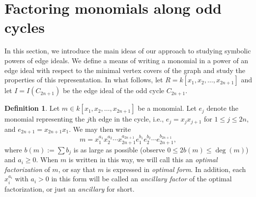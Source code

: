 \documentclass[12pt]{amsart}
\renewcommand{\ge}{\geqslant}
\renewcommand{\le}{\leqslant}
\theoremstyle{plain}
\newtheorem{theorem}{Theorem}[section]
\theoremstyle{definition}
\newtheorem{definition}[theorem]{Definition}
\begin{document}




\section{Factoring monomials along odd cycles}

In this section, we introduce the main ideas of our approach to studying symbolic powers of edge ideals.
We define a means of writing a monomial in a power of an edge ideal with respect to the minimal vertex covers of the graph and study the properties of this representation.
In what follows, let $R = k[x_1,x_2,\ldots,x_{2n+1}]$ and let $I = I(C_{2n+1})$ be the edge ideal of the odd cycle $C_{2n+1}$. %




\begin{definition}\label{defn:optimal}
Let $m\in k[x_1,x_2,\ldots,x_{2n+1}]$ be a monomial.
	Let $e_j$ denote the monomial representing the $j$th edge in the cycle, i.e., $e_j = x_j x_{j+1}$ for $1\le j \le 2n$, and $e_{2n+1} = x_{2n+1} x_1$.
	We may then write 
	$$
		m = x_1^{a_1} x_2^{a_2} \cdots x_{2n+1}^{a_{2n+1}} e_1^{b_1} e_2^{b_2} \cdots e_{2n+1}^{b_{2n+1}},
	$$
	where $b(m) := \sum b_j$ is as large as possible (observe $0\le 2b(m) \le \deg(m)$) and $a_i \ge 0$. 
	When $m$ is written in this way, we will call this an \emph{optimal factorization} of $m$, or say that $m$ is expressed in \emph{optimal form}. In addition, each $x_i^{a_i}$ with $a_i > 0$ in this form will be called an \emph{ancillary factor} of the optimal factorization, or just an \emph{ancillary} for short.
\end{definition}

\end{document}
